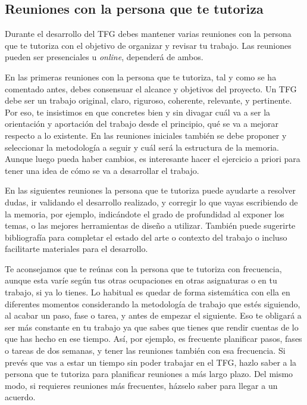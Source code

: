 \subsection{Reuniones con la persona que te tutoriza}%

Durante el desarrollo del TFG debes mantener varias reuniones con la persona que te tutoriza con el objetivo de organizar y revisar tu trabajo. Las reuniones pueden ser presenciales u \textit{online}, dependerá de ambos.

En las primeras reuniones con la persona que te tutoriza, tal y como se ha comentado antes, debes consensuar el alcance y objetivos del proyecto. Un TFG debe ser un trabajo original, claro, riguroso, coherente, relevante, y pertinente. Por eso, te insistimos en que concretes bien y sin divagar cuál va a ser la orientación y aportación del trabajo desde el principio, qué se va a mejorar respecto a lo existente. En las reuniones iniciales también se debe proponer y seleccionar la metodología a seguir y cuál será la estructura de la memoria. Aunque luego pueda haber cambios, es interesante hacer el ejercicio a priori para tener una idea de cómo se va a desarrollar el trabajo.

En las siguientes reuniones la persona que te tutoriza puede ayudarte a resolver dudas, ir validando el desarrollo realizado, y corregir lo que vayas escribiendo de la memoria, por ejemplo, indicándote el grado de profundidad al exponer los temas, o las mejores herramientas de diseño a utilizar. También puede sugerirte bibliografía para completar el estado del arte o contexto del trabajo o incluso facilitarte materiales para el desarrollo. 

Te aconsejamos que te reúnas con la persona que te tutoriza con frecuencia, aunque esta varíe según tus otras ocupaciones en otras asignaturas o en tu trabajo, si ya lo tienes. Lo habitual es quedar de forma sistemática con ella en diferentes momentos considerando la metodología de trabajo que estés siguiendo, al acabar un paso, fase o tarea, y antes de empezar el siguiente. Eso te obligará a ser más constante en tu trabajo ya que sabes que tienes que rendir cuentas de lo que has hecho en ese tiempo. Así, por ejemplo, es frecuente planificar pasos, fases o tareas de dos semanas, y tener las reuniones también con esa frecuencia. Si prevés que vas a estar un tiempo sin poder trabajar en el TFG, hazlo saber a la persona que te tutoriza para planificar reuniones a más largo plazo. Del mismo modo, si requieres reuniones más frecuentes, házselo saber para llegar a un acuerdo. 

